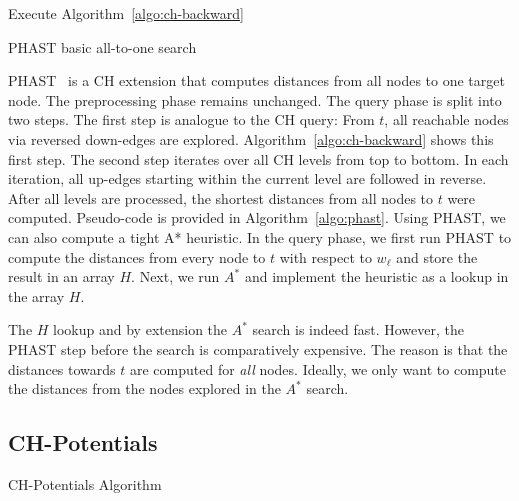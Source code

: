 \documentclass[a4paper,UKenglish,cleveref, autoref, thm-restate]{lipics-v2021}
\begin{document}
\begin{algorithm2e}
Execute Algorithm~\ref{algo:ch-backward}\;
\caption{PHAST basic all-to-one search}
\label{algo:phast}
\end{algorithm2e}

PHAST~\cite{dgnw-phast-13} is a CH extension that computes distances from all nodes to one target node.
The preprocessing phase remains unchanged.
The query phase is split into two steps.
The first step is analogue to the CH query:
From $t$, all reachable nodes via reversed down-edges are explored.
Algorithm~\ref{algo:ch-backward} shows this first step.
The second step iterates over all CH levels from top to bottom.
In each iteration, all up-edges starting within the current level are followed in reverse.
After all levels are processed, the shortest distances from all nodes to $t$ were computed.
Pseudo-code is provided in Algorithm~\ref{algo:phast}.
Using PHAST, we can also compute a tight A* heuristic.
In the query phase, we first run PHAST to compute the distances from every node to $t$ with respect to $w_\ell$ and store the result in an array $H$.
Next, we run $A^*$ and implement the heuristic as a lookup in the array $H$.

The $H$ lookup and by extension the $A^*$ search is indeed fast.
However, the PHAST step before the search is comparatively expensive.
The reason is that the distances towards $t$ are computed for \emph{all} nodes.
Ideally, we only want to compute the distances from the nodes explored in the $A^*$ search.

\subsection{CH-Potentials}

\begin{algorithm2e}
\caption{CH-Potentials Algorithm}
\label{algo:pot}
\end{algorithm2e}
\end{document}
